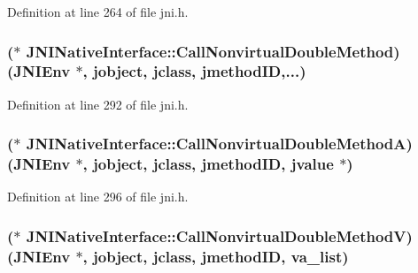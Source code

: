 Definition at line 264 of file jni.\-h.

\hypertarget{struct_j_n_i_native_interface_a3739bbec960d6208f327c3133241ca63}{
\subsubsection[{Call\-Nonvirtual\-Double\-Method}]{($\ast$ J\-N\-I\-Native\-Interface\-::\-Call\-Nonvirtual\-Double\-Method)({\bf J\-N\-I\-Env} $\ast$, {\bf jobject}, {\bf jclass}, {\bf jmethod\-I\-D},...)}}\label{struct_j_n_i_native_interface_a3739bbec960d6208f327c3133241ca63}


Definition at line 292 of file jni.\-h.

\hypertarget{struct_j_n_i_native_interface_a8fd1eeab412d40742efc34a90fb8207b}{
\subsubsection[{Call\-Nonvirtual\-Double\-Method\-A}]{($\ast$ J\-N\-I\-Native\-Interface\-::\-Call\-Nonvirtual\-Double\-Method\-A)({\bf J\-N\-I\-Env} $\ast$, {\bf jobject}, {\bf jclass}, {\bf jmethod\-I\-D}, {\bf jvalue} $\ast$)}}\label{struct_j_n_i_native_interface_a8fd1eeab412d40742efc34a90fb8207b}


Definition at line 296 of file jni.\-h.

\hypertarget{struct_j_n_i_native_interface_a01b4324809f511383dfdf5bdd7ad58ac}{
\subsubsection[{Call\-Nonvirtual\-Double\-Method\-V}]{($\ast$ J\-N\-I\-Native\-Interface\-::\-Call\-Nonvirtual\-Double\-Method\-V)({\bf J\-N\-I\-Env} $\ast$, {\bf jobject}, {\bf jclass}, {\bf jmethod\-I\-D}, va\-\_\-list)}}\label{struct_j_n_i_native_interface_a01b4324809f511383dfdf5bdd7ad58ac}


